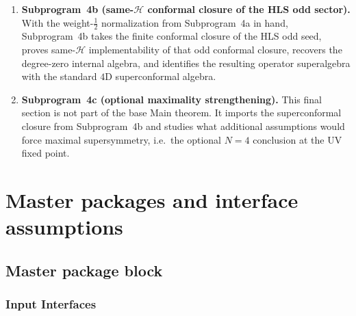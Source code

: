 \begin{enumerate}[label=\textnormal{(\roman*)},leftmargin=*,itemsep=0.4em]
  common UV sector and forces their dilatation weight to be \(\tfrac12\).
\item \textbf{Subprogram~4b (same-\(\mathcal H\) conformal closure of the HLS odd sector).}
  With the weight-\(\tfrac12\) normalization from Subprogram~4a in hand,
  Subprogram~4b takes the finite conformal closure of the HLS odd seed,
  proves same-\(\mathcal H\) implementability of that odd conformal closure,
  recovers the degree-zero internal algebra, and identifies the resulting
  operator superalgebra with the standard \(4\)D superconformal algebra.
\item \textbf{Subprogram~4c (optional maximality strengthening).}
  This final section is not part of the base Main theorem.  It imports the
  superconformal closure from Subprogram~4b and studies what additional
  assumptions would force maximal supersymmetry, i.e.\ the optional
  \(N=4\) conclusion at the UV fixed point.
\end{enumerate}

\section{Master packages and interface assumptions}
\label{sec:setup}

\subsection{Master package block}

\subsubsection{Input Interfaces}

